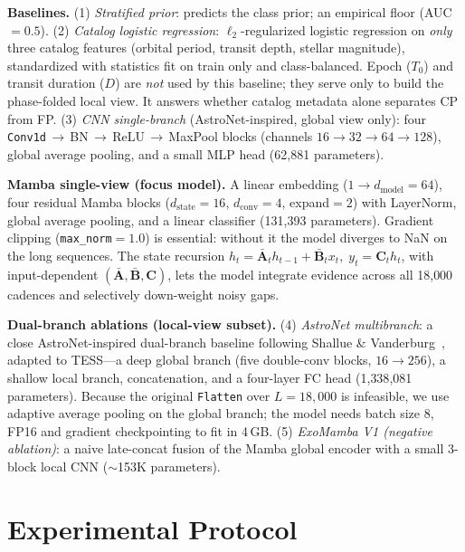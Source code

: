 \documentclass[conference]{IEEEtran}
\begin{document}
\textbf{Baselines.}
(1) \emph{Stratified prior}: predicts the class prior; an empirical floor
(AUC $=0.5$).
(2) \emph{Catalog logistic regression}: $\ell_2$-regularized logistic regression on
\emph{only} three catalog features (orbital period, transit depth, stellar
magnitude), standardized with statistics fit on train only and class-balanced.
Epoch ($T_0$) and transit duration ($D$) are \emph{not} used by this baseline;
they serve only to build the phase-folded local view. It answers
whether catalog metadata alone separates CP from FP.
(3) \emph{CNN single-branch} (AstroNet-inspired, global view only): four
\texttt{Conv1d}$\,\to\,$BN$\,\to\,$ReLU$\,\to\,$MaxPool blocks
(channels $16{\to}32{\to}64{\to}128$), global average pooling, and a small MLP head
(62{,}881 parameters).

\textbf{Mamba single-view (focus model).} A linear embedding
($1{\to}d_{\text{model}}{=}64$), four residual Mamba blocks
($d_{\text{state}}{=}16$, $d_{\text{conv}}{=}4$, expand$=2$) with LayerNorm, global
average pooling, and a linear classifier (131{,}393 parameters). Gradient clipping
(\texttt{max\_norm}$=1.0$) is essential: without it the model diverges to NaN on the
long sequences. The state recursion
$h_t=\bar{\mathbf{A}}_t h_{t-1}+\bar{\mathbf{B}}_t x_t,\; y_t=\mathbf{C}_t h_t$,
with input-dependent $(\bar{\mathbf{A}},\bar{\mathbf{B}},\mathbf{C})$, lets the
model integrate evidence across all 18{,}000 cadences and selectively down-weight
noisy gaps.

\textbf{Dual-branch ablations (local-view subset).}
(4) \emph{AstroNet multibranch}: a close AstroNet-inspired dual-branch baseline
following Shallue \& Vanderburg~\cite{shallue2018}, adapted to TESS---a deep global
branch (five double-conv blocks, $16{\to}256$), a shallow local branch,
concatenation, and a four-layer FC head (1{,}338{,}081 parameters). Because the
original \texttt{Flatten} over $L=18{,}000$ is infeasible, we use adaptive average
pooling on the global branch; the model needs batch size 8, FP16 and gradient
checkpointing to fit in 4\,GB. (5) \emph{ExoMamba V1 (negative ablation)}: a naive
late-concat fusion of the Mamba global encoder with a small 3-block local CNN
($\sim$153K parameters).

\section{Experimental Protocol}
\end{document}
